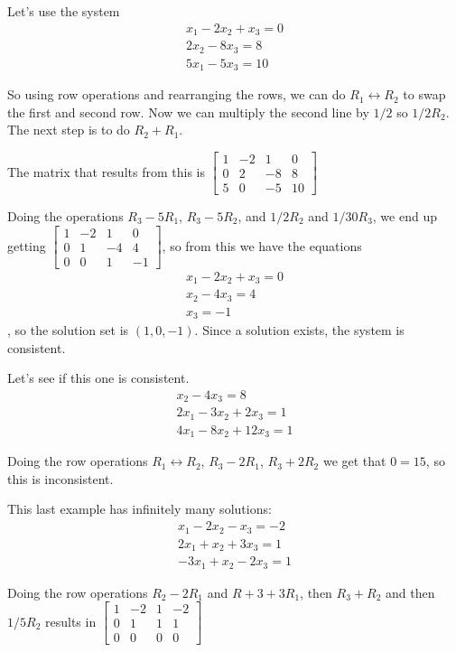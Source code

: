 \documentclass[../linalg.tex]{subfiles}
\begin{document}
Let's use the system 
\begin{align*}
x_1-2x_2+x_3 =0 \\
2x_2 - 8x_3 = 8 \\
5x_1-5x_3=10
\end{align*}

So using row operations and rearranging the rows, we can do $R_1 \leftrightarrow R_2$ to swap the first and second row. Now we can multiply the second line 
by $1/2$ so $1/2R_2$. The next step is to do $R_2+R_1$. 

The matrix that results from this is $\begin{bmatrix}
    1 & -2 & 1 & 0 \\
    0 & 2 & -8 & 8 \\ 
    5 & 0 & -5 & 10 
\end{bmatrix}$

Doing the operations $R_3-5R_1$, $R_3-5R_2$, and $1/2R_2$ and $1/30R_3$, we end up getting $\begin{bmatrix}
    1 & -2 & 1 & 0 \\
    0 & 1 & -4 & 4 \\ 
    0 & 0 & 1 & -1
\end{bmatrix}$, so from this we have the equations 
\begin{align*}
    x_1-2x_2+x_3 =0 \\
    x_2-4x_3=4\\
    x_3=-1
\end{align*}, so the solution set is $(1,0,-1)$. Since a solution exists, the system is consistent.

Let's see if this one is consistent.
\begin{align*}
    x_2-4x_3 =8 \\
    2x_1-3x_2+2x_3 = 1\\
    4x_1-8x_2+12x_3 = 1
\end{align*}

Doing the row operations $R_1\leftrightarrow R_2$, $R_3-2R_1$, $R_3+2R_2$ we get that $0=15$, so this is inconsistent.

This last example has infinitely many solutions:
\begin{align*}
    x_1-2x_2-x_3=-2 \\
    2x_1+x_2+3x_3 = 1\\
    -3x_1+x_2-2x_3 = 1
\end{align*}

Doing the row operations $R_2-2R_1$ and  $R+3+3R_1$, then $R_3+R_2$ and then $1/5R_2$ results in $\begin{bmatrix}
    1 & -2 & 1 & -2 \\
    0 & 1 & 1 & 1 \\
    0 & 0 & 0 & 0
\end{bmatrix}$
\end{document}
